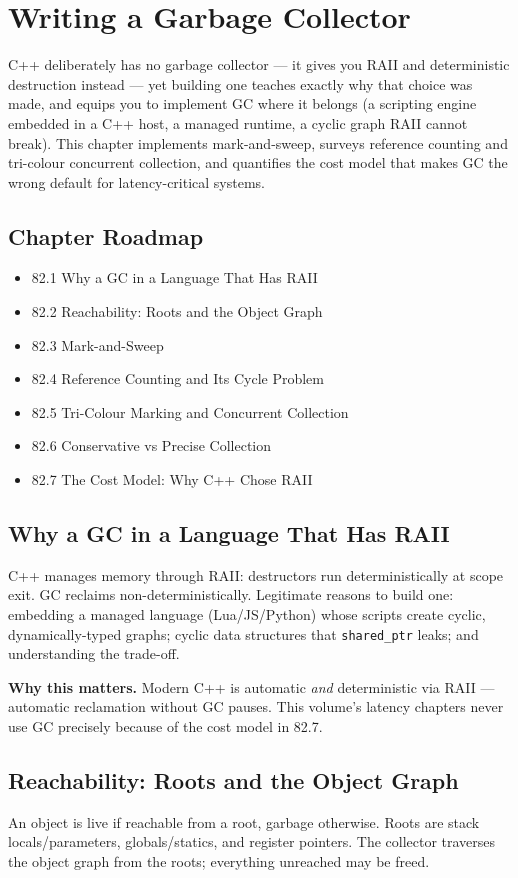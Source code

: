 \chapter{Writing a Garbage Collector}

C++ deliberately has no garbage collector --- it gives you RAII and deterministic destruction instead --- yet building one teaches exactly why that choice was made, and equips you to implement GC where it belongs (a scripting engine embedded in a C++ host, a managed runtime, a cyclic graph RAII cannot break). This chapter implements mark-and-sweep, surveys reference counting and tri-colour concurrent collection, and quantifies the cost model that makes GC the wrong default for latency-critical systems.

\section*{Chapter Roadmap}
\begin{itemize}
\item 82.1 Why a GC in a Language That Has RAII
\item 82.2 Reachability: Roots and the Object Graph
\item 82.3 Mark-and-Sweep
\item 82.4 Reference Counting and Its Cycle Problem
\item 82.5 Tri-Colour Marking and Concurrent Collection
\item 82.6 Conservative vs Precise Collection
\item 82.7 The Cost Model: Why C++ Chose RAII
\end{itemize}

\section{Why a GC in a Language That Has RAII}
C++ manages memory through RAII: destructors run deterministically at scope exit. GC reclaims non-deterministically. Legitimate reasons to build one: embedding a managed language (Lua/JS/Python) whose scripts create cyclic, dynamically-typed graphs; cyclic data structures that \texttt{shared\_ptr} leaks; and understanding the trade-off.

\textbf{Why this matters.} Modern C++ is automatic \emph{and} deterministic via RAII --- automatic reclamation without GC pauses. This volume's latency chapters never use GC precisely because of the cost model in 82.7.

\section{Reachability: Roots and the Object Graph}
An object is live if reachable from a root, garbage otherwise. Roots are stack locals/parameters, globals/statics, and register pointers. The collector traverses the object graph from the roots; everything unreached may be freed.

